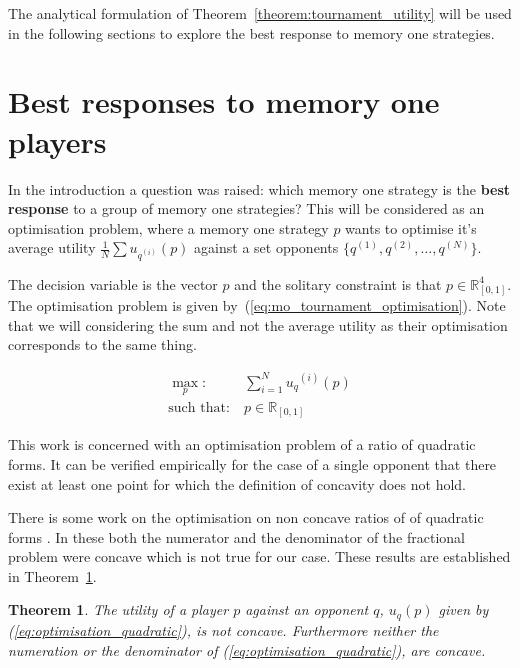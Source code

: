 \documentclass[10pt]{article}
\newcommand{\R}{\mathbb{R}}
\newtheorem{theorem}{Theorem}
\begin{document}
The analytical formulation of Theorem~\ref{theorem:tournament_utility} will be
used in the following sections to explore the best response to memory one
strategies.

\section{Best responses to memory one players}\label{section:best_response_mem_one}

In the introduction a question was raised: which memory one strategy is the \textbf{best response}
to a group of memory one strategies? This will be considered as an optimisation problem,
where a memory one strategy \(p\) wants to optimise it's average utility \( \frac{1}{N} \sum u_{q ^{(i)}} (p)\)
against a set opponents \(\{q^{(1)}, q^{(2)}, \dots, q^{(N)} \}\). 

The decision variable is the vector \(p\) and the solitary constraint is that \(p \in \R^4_{[0, 1]} \).
The optimisation problem is given by~(\ref{eq:mo_tournament_optimisation}). Note that
we will considering the sum and not the average utility as their optimisation corresponds
to the same thing.

\begin{equation}\label{eq:mo_tournament_optimisation}
    \begin{aligned}
    \max_p: & \ \sum_{i=1} ^ {N} {u_q}^{(i)} (p) 
    \\
    \text{such that}: & \ p \in \R_{[0, 1]} 
    \end{aligned}
\end{equation}

This work is concerned with an optimisation problem of a ratio of quadratic forms.
It can be verified empirically for the case of a single opponent that there exist at
least one point for which the definition of concavity does not hold.

There is some work on the optimisation on non concave ratios of of quadratic forms
\cite{Beck2009, Hongyan2014}. In these both the numerator and the denominator
of the fractional problem were concave which is not true for our case. 
These results are established in Theorem~\ref{theorem:concavity}.

\begin{theorem}\label{theorem:concavity}
    The utility of a player \(p\) against an opponent \(q\), \(u_q (p)\) given by
    (\ref{eq:optimisation_quadratic}), is not concave. Furthermore neither the
    numeration or the denominator of (\ref{eq:optimisation_quadratic}), are concave.
\end{theorem}
\end{document}
